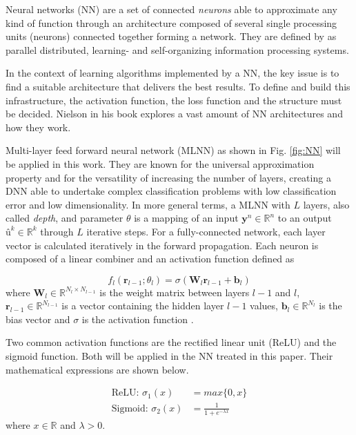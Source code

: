 \documentclass[conference]{IEEEtran}
\begin{document}
Neural networks (NN) are a set of connected \textit{neurons} able to approximate any kind of function through an architecture composed of several single processing units (neurons) connected together forming a network. They are defined by \cite{b9} as parallel distributed, learning- and self-organizing information processing systems. 

In the context of learning algorithms implemented by a NN, the key issue is to find a suitable architecture that delivers the best results. To define and build this infrastructure, the activation function, the loss function and the structure must be decided. Nielson \cite{b8} in his book explores a vast amount of NN architectures and how they work. 

Multi-layer feed forward neural network (MLNN) as shown in Fig. \ref{fig:NN} will be applied in this work. They are known for the universal approximation property \cite{b9} and for the versatility of increasing the number of layers, creating a DNN able to undertake complex classification problems with low classification error and low dimensionality. In more general terms, a MLNN with $L$ layers, also called \textit{depth}, and parameter $\theta$ is a mapping of an input $\textbf{y}^n \in \mathbb{R}^{n}$ to an output $\textbf{û}^k \in \mathbb{R}^{k}$ through $L$ iterative steps. For a fully-connected network, each layer vector is calculated iteratively in the forward propagation. Each neuron is composed of a linear combiner and an activation function defined as 

\begin{equation}\label{eq:eqFP}
	f_{l}\left( \textbf{r}_{l-1};\theta _{l}\right) = \sigma \left( \textbf{W}_{l}\textbf{r}_{l-1}+\textbf{b}_{l}\right)
\end{equation}
where $\textbf{W}_{l}\in \mathbb{R} ^{N_{l}\times N_{l-1}}$ is the weight matrix between layers $l-1$ and $l$, $\textbf{r}_{l-1} \in \mathbb{R} ^{N_{l-1}}$ is a vector containing the hidden layer $l-1$ values, $\textbf{b}_{l}\in \mathbb{R} ^{N_l}$ is the bias vector and $\sigma$ is the activation function \cite{b2}.

%
Two common activation functions are the rectified linear unit (ReLU) and the sigmoid function. Both will be applied in the NN treated in this paper. Their mathematical expressions are shown below.

\begin{align}
	\text{ReLU: } \sigma_1 (x)& = max\{0, x\} \label{eq:relu}\\ 
	\text{Sigmoid: } \sigma_2 (x)& = \frac{1}{1+e^{- \lambda x}} \label{eq:sig}
\end{align}
where $x \in \mathbb{R}$ and $\lambda>0$.
\end{document}
